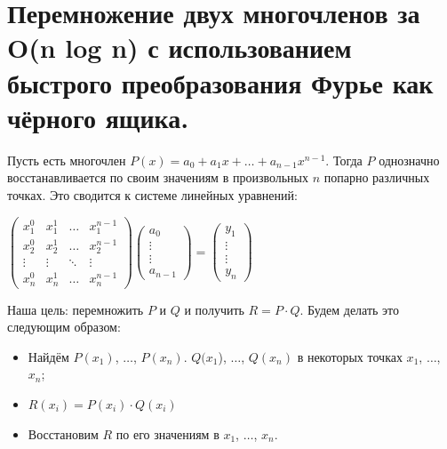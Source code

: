 \section{Перемножение двух многочленов за O(n log n) с использованием быстрого преобразования Фурье как чёрного ящика.}

Пусть есть многочлен $P (x) = a_0 + a_1 x + \dots + a_{n - 1} x^{n - 1}$. Тогда $P$ однозначно восстанавливается по своим значениям в произвольных $n$ попарно различных точках. Это сводится к системе линейных уравнений:

\begin{center}
    $\left( \begin{matrix} x_1^0 & x_1^1 & \dots & x_1^{n - 1} \\ x_2^0 & x_2^1 & \dots & x_2^{n - 1} \\ \vdots & \vdots & \ddots & \vdots \\ x_n^0 & x_n^1 & \dots & x_n^{n-1} \end{matrix} \right) \left( \begin{matrix} a_0 \\ \vdots \\ \vdots \\ a_{n-1} \end{matrix} \right) = \left( \begin{matrix} y_1 \\ \vdots \\ \vdots \\ y_n \end{matrix} \right)$
\end{center}

Наша цель: перемножить $P$ и $Q$ и получить $R = P \cdot Q$. Будем делать это следующим образом:
\begin{itemize}
    \item Найдём $P ({x_1})$, $\dots$, $P({x_n})$. $Q ({x_1}$), $\dots$, $Q ({x_n})$ в некоторых точках $x_1$, $\dots$, $x_n$;
    \item $R ({x_i}) = P ({x_i}) \cdot Q ({x_i})$
    \item Восстановим $R$ по его значениям в $x_1$, $\dots$, $x_n$.
\end{itemize}

